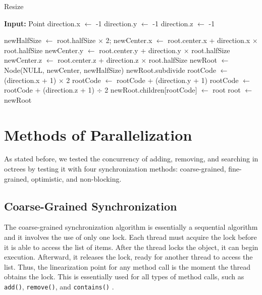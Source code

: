 \documentclass[conference]{IEEEtran}
\begin{document}
\begin{algorithm}[h]
    \caption{Resize}\label{alg:octree resize}
    \begin{algorithmic}[1]
        \Statex \textbf{Input:} Point
        \State direction.x $\leftarrow$ -1
        \EndIf
        \State direction.y $\leftarrow$ -1
        \EndIf
        \State direction.z $\leftarrow$ -1
        \EndIf

        \State newHalfSize $\leftarrow$ root.halfSize $\times$ 2;
        \State newCenter.x $\leftarrow$ root.center.x + direction.x $\times$ root.halfSize
        \State newCenter.y $\leftarrow$ root.center.y + direction.y $\times$ root.halfSize
        \State newCenter.z $\leftarrow$ root.center.z + direction.z $\times$ root.halfSize
        \State newRoot $\leftarrow$ Node(NULL, newCenter, newHalfSize)
        \State newRoot.subdivide
        \State rootCode $\leftarrow$ (direction.x + 1) $\times$ 2
        \State rootCode $\leftarrow$ rootCode + (direction.y + 1)
        \State rootCode $\leftarrow$ rootCode + (direction.z + 1) $\div$ 2
        \State newRoot.children[rootCode] $\leftarrow$ root
        \State root $\leftarrow$ newRoot
        \EndWhile
    \end{algorithmic}
\end{algorithm}

\section{Methods of Parallelization} \label{sec:sec4}

As stated before, we tested the concurrency of adding, removing, and searching in octrees by testing it with four synchronization methods: coarse-grained, fine-grained, optimistic, and non-blocking.

\subsection{Coarse-Grained Synchronization}
The coarse-grained synchronization algorithm is essentially a sequential algorithm and it involves the use of only one lock. Each thread must acquire the lock before it is able to access the list of items. After the thread locks the object, it can begin execution. Afterward, it releases the lock, ready for another thread to access the list. Thus, the linearization point for any method call is the moment the thread obtains the lock. This is essentially used for all types of method calls, such as \verb|add()|, \verb|remove()|, and \verb|contains()| \cite{textbook}.
\end{document}
